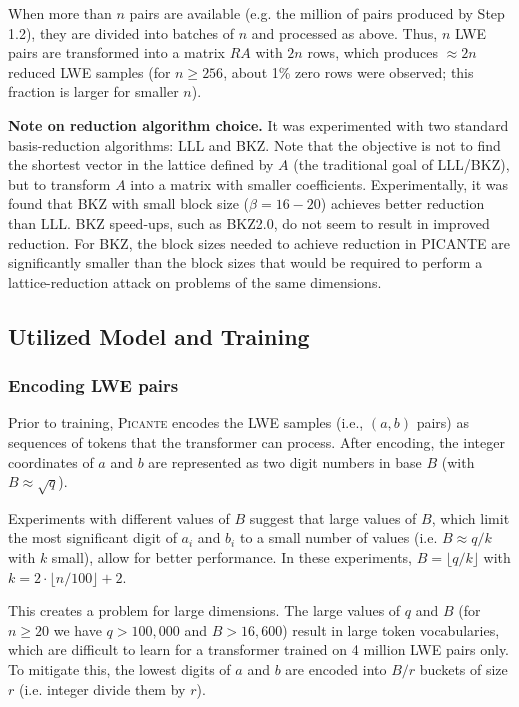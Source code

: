 \documentclass{article}
\begin{document}
When more than \( n \) pairs are available (e.g. the million of pairs produced by Step 1.2), they are divided into batches of \( n \) and processed as above. Thus, \( n \) LWE pairs are transformed into a matrix \( R A \) with \( 2n \) rows, which produces \( \approx 2n \) reduced LWE samples (for \( n \geq 256 \), about 1\% zero rows were observed; this fraction is larger for smaller \( n \)).

\textbf{Note on reduction algorithm choice.} It was experimented with two standard basis-reduction algorithms: LLL and BKZ. Note that the objective is not to find the shortest vector in the lattice defined by \( A \) (the traditional goal of LLL/BKZ), but to transform \( A \) into a matrix with smaller coefficients. Experimentally, it was found that BKZ with small block size (\( \beta = 16 - 20 \)) achieves better reduction than LLL. BKZ speed-ups, such as BKZ2.0, do not seem to result in improved reduction. For BKZ, the block sizes needed to achieve reduction in PICANTE are significantly smaller than the block sizes that would be required to perform a lattice-reduction attack on problems of the same dimensions.

\subsection{Utilized Model and Training}

\subsubsection{Encoding LWE pairs}

Prior to training, \textsc{Picante} encodes the LWE samples (i.e., \( (a, b) \) pairs) as sequences of tokens that the transformer can process. After encoding, the integer coordinates of \( a \) and \( b \) are represented as two digit numbers in base \( B \) (with \( B \approx \sqrt{q} \)). 

Experiments with different values of \( B \) suggest that large values of \( B \), which limit the most significant digit of \( a_i \) and \( b_i \) to a small number of values (i.e. \( B \approx q/k \) with \( k \) small), allow for better performance. In these experiments, \( B = \lfloor q/k \rfloor \) with \( k = 2 \cdot \lfloor n/100 \rfloor + 2 \).

This creates a problem for large dimensions. The large values of \( q \) and \( B \) (for \( n \ge 20 \) we have \( q > 100,000 \) and \( B > 16,600 \)) result in large token vocabularies, which are difficult to learn for a transformer trained on 4 million LWE pairs only. To mitigate this, the lowest digits of \( a \) and \( b \) are encoded into \( B/r \) buckets of size \( r \) (i.e. integer divide them by \( r \)). 
\end{document}
